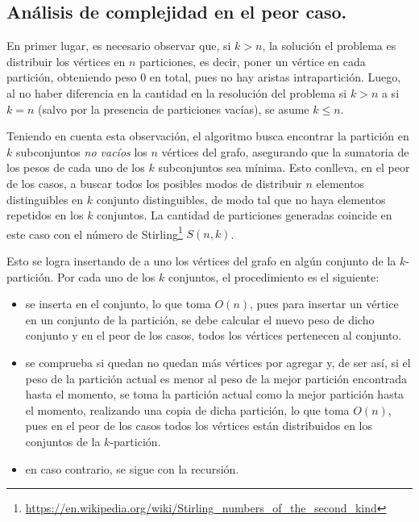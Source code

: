 \newpage

\subsection{Análisis de complejidad en el peor caso.}
\vspace*{0.3cm}


En primer lugar, es necesario observar que, si $k > n$, la solución el problema
es distribuir los vértices en $n$ particiones, es decir, poner un vértice en
cada partición, obteniendo peso $0$ en total, pues no hay aristas
intrapartición. Luego, al no haber diferencia en la cantidad en la resolución
del problema si $k > n$ a si $k = n$ (salvo por la presencia de particiones
vacías), se asume $k \le n$.

Teniendo en cuenta esta observación, el algoritmo busca encontrar la
partición en $k$ subconjuntos \textit{no vacíos} los $n$ vértices del grafo,
asegurando que la sumatoria de los pesos de cada uno de los $k$ subconjuntos
sea mínima. Esto conlleva, en el peor de los casos, a buscar todos los posibles
modos de distribuir $n$ elementos distinguibles en $k$ conjunto distinguibles,
de modo tal que no haya elementos repetidos en los $k$ conjuntos. La cantidad
de particiones generadas coincide en este caso con el número de
Stirling\footnote{
\url{https://en.wikipedia.org/wiki/Stirling_numbers_of_the_second_kind}} $S(n,
k)$.

Esto se logra insertando de a uno los vértices del grafo en algún conjunto de
la $k$-partición. Por cada uno de los $k$ conjuntos, el procedimiento es el
siguiente:
\begin{itemize}
  \item se inserta en el conjunto, lo que toma $O(n)$, pues para insertar un
  vértice en un conjunto de la partición, se debe calcular el nuevo peso de
  dicho conjunto y en el peor de los casos, todos los vértices pertenecen al
  conjunto.
  \item se comprueba si quedan no quedan más vértices por agregar y, de ser
  así, si el peso de la partición actual es menor al peso de la mejor partición
  encontrada hasta el momento, se toma la partición actual como la mejor
  partición hasta el momento, realizando una copia de dicha partición, lo que
  toma $O(n)$, pues en el peor de los casos todos los vértices están
  distribuidos en los conjuntos de la $k$-partición.
  \item en caso contrario, se sigue con la recursión.
\end{itemize}

